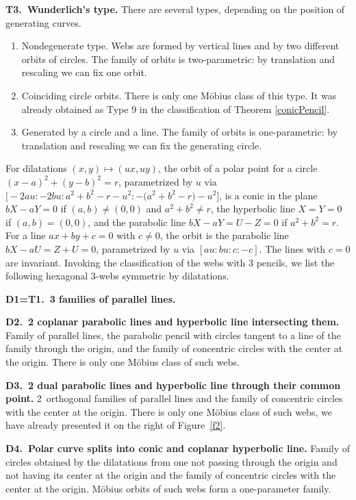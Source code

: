 \documentclass[pdftex]{sigma}
\numberwithin{equation}{section}
\begin{document}
 {\bf T3.\ Wunderlich's type.}
 There are several types, depending on the position of generating curves.
\begin{enumerate}\itemsep=0pt
\item[(1)] Nondegenerate type. Webs are formed by vertical lines and by two different orbits of circles. The family of orbits is two-parametric: by translation and rescaling we can fix one orbit.

\item[(2)] Coinciding circle orbits. There is only one M\"obius class of this type. It was already obtained as Type 9 in the classification of Theorem \ref{conicPencil}.

\item[(3)] Generated by a circle and a line. The family of orbits is one-parametric: by translation and rescaling we can fix the generating circle.
\end{enumerate}

 For dilatations $(x,y)\mapsto (ux,uy)$, the orbit of a polar point for a circle $(x-a)^2+(y-b)^2=r$, parametrized by $u$ via $\bigl[-2au:-2bu: a^2+b^2-r-u^2: -\bigl(a^2+b^2-r\bigr)-u^2\bigr]$, is a conic in the plane $bX-aY=0$ if $(a,b)\ne (0,0)$ and $a^2+b^2\ne r$, the hyperbolic line $X=Y=0$ if $(a,b)= (0,0)$, and the parabolic line $bX-aY=U-Z=0$ if $a^2+b^2=r$. For a line $ax+by+c=0$ with $c\ne 0$, the orbit is the parabolic line $bX-aU=Z+U=0$, parametrized by $u$ via $[au:bu:c:-c]$. The lines with $c=0$ are invariant.
Invoking the classification of the webs with 3 pencils, we list the following hexagonal 3-webs symmetric by dilatations.


 {\bf D1=T1.\ 3 families of parallel lines.}

 {\bf D2.\ 2 coplanar parabolic lines and hyperbolic line intersecting them.}
 Family of parallel lines, the parabolic pencil with circles tangent to a line of the family through the origin, and the family of concentric circles with the center at the origin. There is only one M\"obius class of such webs.


 {\bf D3.\ 2 dual parabolic lines and hyperbolic line through their common point.}
 2~orthogonal families of parallel lines and the family of concentric circles with the center at the origin. There is only one M\"obius class of such webs, we have already presented it on the right of Figure~\ref{f2}.


 {\bf D4.\ Polar curve splits into conic and coplanar hyperbolic line.}
 Family of circles obtained by the dilatations from one not passing through the origin and not having its center at the origin and the family of concentric circles with the center at the origin. M\"obius orbits of such webs form a one-parameter family.
\end{document}
